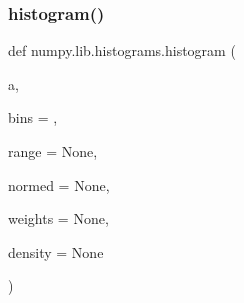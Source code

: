 \subsubsection{\texorpdfstring{histogram()}{histogram()}}
{\footnotesize\ttfamily def numpy.\+lib.\+histograms.\+histogram (\begin{DoxyParamCaption}\item[{}]{a,  }\item[{}]{bins = {},  }\item[{}]{range = {\ttfamily None},  }\item[{}]{normed = {\ttfamily None},  }\item[{}]{weights = {\ttfamily None},  }\item[{}]{density = {\ttfamily None} }\end{DoxyParamCaption})}

